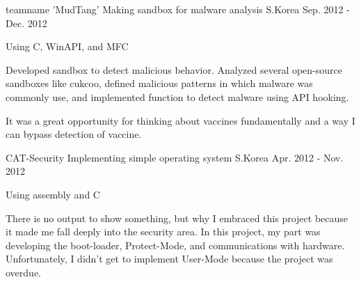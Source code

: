 \begin{cventries}
  \cventry
    {teamname 'MudTang'}
    {Making sandbox for malware analysis}
    {S.Korea}
    {Sep. 2012 - Dec. 2012}
    {
      \begin{cvitems}
        \item {Using C, WinAPI, and MFC}
        \item {Developed sandbox to detect malicious behavior. Analyzed several open-source sandboxes like cukcoo, defined malicious patterns in which malware was commonly use, and implemented function to detect malware using API hooking.}
        \item {It was a great opportunity for thinking about vaccines fundamentally and a way I can bypass detection of vaccine.}
      \end{cvitems}
    }
  \cventry
    {CAT-Security}
    {Implementing simple operating system}
    {S.Korea}
    {Apr. 2012 - Nov. 2012}
    {
      \begin{cvitems}
        \item {Using assembly and C}
        \item {There is no output to show something, but why I embraced this project because it made me fall deeply into the security area. In this project, my part was developing the boot-loader, Protect-Mode, and communications with hardware. Unfortunately, I didn't get to implement User-Mode because the project was overdue.}
      \end{cvitems}
    }

\end{cventries}
